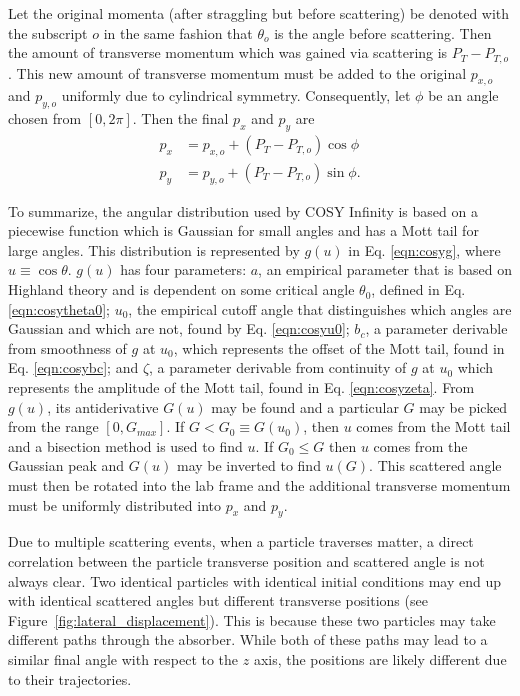 Let the original momenta (after straggling but before scattering) be denoted with the subscript $o$ in the same fashion that $\theta_o$ is the angle before scattering. Then the amount of transverse momentum which was gained via scattering is $P_T-P_{T,o}$. This new amount of transverse momentum must be added to the original $p_{x,o}$ and $p_{y,o}$ uniformly due to cylindrical symmetry. Consequently, let $\phi$ be an angle chosen from $[0,2\pi]$. Then the final $p_x$ and $p_y$ are
\begin{align*}
p_x&=p_{x,o}+(P_T-P_{T,o})\cos\phi\\
p_y&=p_{y,o}+(P_T-P_{T,o})\sin\phi.
\end{align*}







\fi

To summarize, the angular distribution used by COSY Infinity is based on a piecewise function which is Gaussian for small angles \cite{gs} and has a Mott tail for large angles. This distribution is represented by $g(u)$ in Eq. \eqref{eqn:cosyg}, where $u\equiv \cos\theta$. $g(u)$ has four parameters: $a$, an empirical parameter that is based on Highland theory \cite{highland} and is dependent on some critical angle $\theta_0$, defined in Eq. \eqref{eqn:cosytheta0}; $u_0$, the empirical cutoff angle that distinguishes which angles are Gaussian and which are not, found by Eq. \eqref{eqn:cosyu0}; $b_c$, a parameter derivable from smoothness of $g$ at $u_0$, which represents the offset of the Mott tail, found in Eq. \eqref{eqn:cosybc}; and $\zeta$, a parameter derivable from continuity of $g$ at $u_0$ which represents the amplitude of the Mott tail, found in Eq. \eqref{eqn:cosyzeta}. From $g(u)$, its antiderivative $G(u)$ may be found and a particular $G$ may be picked from the range $[0,G_{max}]$. If $G<G_0 \equiv G(u_0)$, then $u$ comes from the Mott tail and a bisection method is used to find $u$. If $G_0 \leq G$ then $u$ comes from the Gaussian peak and $G(u)$ may be inverted to find $u(G)$. This scattered angle must then be rotated into the lab frame and the additional transverse momentum must be uniformly distributed into $p_x$ and $p_y$.

%
%
\label{sec:COSYTransverseDisplacement}\par
Due to multiple scattering events, when a particle traverses matter, a direct correlation between the particle transverse position and scattered angle is not always clear. Two identical particles with identical initial conditions may end up with identical scattered angles but different transverse positions (see Figure~\ref{fig:lateral_displacement}). This is because these two particles may take different paths through the absorber. While both of these paths may lead to a similar final angle with respect to the $z$ axis, the positions are likely different due to their trajectories.

